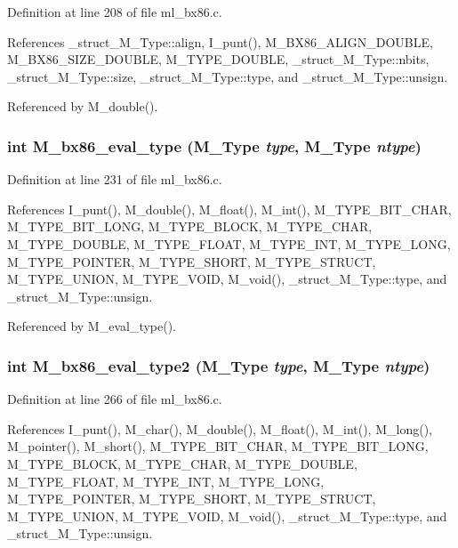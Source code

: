 Definition at line 208 of file ml\_\-bx86.c.

References \_\-struct\_\-M\_\-Type::align, I\_\-punt(), M\_\-BX86\_\-ALIGN\_\-DOUBLE, M\_\-BX86\_\-SIZE\_\-DOUBLE, M\_\-TYPE\_\-DOUBLE, \_\-struct\_\-M\_\-Type::nbits, \_\-struct\_\-M\_\-Type::size, \_\-struct\_\-M\_\-Type::type, and \_\-struct\_\-M\_\-Type::unsign.

Referenced by M\_\-double().
\subsubsection{\setlength{\rightskip}{0pt plus 5cm}int M\_\-bx86\_\-eval\_\-type (\bf{M\_\-Type} {\em type}, \bf{M\_\-Type} {\em ntype})}\label{ml__bx86_8c_9a666f0e87bd84c7d16dab6c4603d6b3}




Definition at line 231 of file ml\_\-bx86.c.

References I\_\-punt(), M\_\-double(), M\_\-float(), M\_\-int(), M\_\-TYPE\_\-BIT\_\-CHAR, M\_\-TYPE\_\-BIT\_\-LONG, M\_\-TYPE\_\-BLOCK, M\_\-TYPE\_\-CHAR, M\_\-TYPE\_\-DOUBLE, M\_\-TYPE\_\-FLOAT, M\_\-TYPE\_\-INT, M\_\-TYPE\_\-LONG, M\_\-TYPE\_\-POINTER, M\_\-TYPE\_\-SHORT, M\_\-TYPE\_\-STRUCT, M\_\-TYPE\_\-UNION, M\_\-TYPE\_\-VOID, M\_\-void(), \_\-struct\_\-M\_\-Type::type, and \_\-struct\_\-M\_\-Type::unsign.

Referenced by M\_\-eval\_\-type().
\subsubsection{\setlength{\rightskip}{0pt plus 5cm}int M\_\-bx86\_\-eval\_\-type2 (\bf{M\_\-Type} {\em type}, \bf{M\_\-Type} {\em ntype})}\label{ml__bx86_8c_2013319ca9900a4b7225399b6f3a9fa6}




Definition at line 266 of file ml\_\-bx86.c.

References I\_\-punt(), M\_\-char(), M\_\-double(), M\_\-float(), M\_\-int(), M\_\-long(), M\_\-pointer(), M\_\-short(), M\_\-TYPE\_\-BIT\_\-CHAR, M\_\-TYPE\_\-BIT\_\-LONG, M\_\-TYPE\_\-BLOCK, M\_\-TYPE\_\-CHAR, M\_\-TYPE\_\-DOUBLE, M\_\-TYPE\_\-FLOAT, M\_\-TYPE\_\-INT, M\_\-TYPE\_\-LONG, M\_\-TYPE\_\-POINTER, M\_\-TYPE\_\-SHORT, M\_\-TYPE\_\-STRUCT, M\_\-TYPE\_\-UNION, M\_\-TYPE\_\-VOID, M\_\-void(), \_\-struct\_\-M\_\-Type::type, and \_\-struct\_\-M\_\-Type::unsign.

